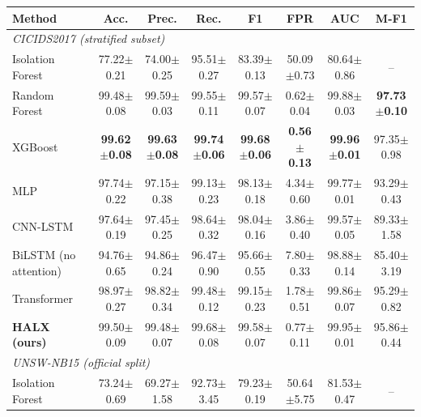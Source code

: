\begin{tabular}{@{}l@{\hspace{3pt}}ccccccc@{}}
\toprule
\textbf{Method} & \textbf{Acc.} & \textbf{Prec.} & \textbf{Rec.} & \textbf{F1} & \textbf{FPR} & \textbf{AUC} & \textbf{M-F1} \\
\midrule
\multicolumn{8}{l}{\textit{CICIDS2017 (stratified subset)}} \\
Isolation Forest~\cite{liu2008iforest} & 77.22{\tiny$\pm$0.21} & 74.00{\tiny$\pm$0.25} & 95.51{\tiny$\pm$0.27} & 83.39{\tiny$\pm$0.13} & 50.09{\tiny$\pm$0.73} & 80.64{\tiny$\pm$0.86} & -- \\
Random Forest~\cite{breiman2001rf} & 99.48{\tiny$\pm$0.08} & 99.59{\tiny$\pm$0.03} & 99.55{\tiny$\pm$0.11} & 99.57{\tiny$\pm$0.07} & 0.62{\tiny$\pm$0.04} & 99.88{\tiny$\pm$0.03} & \textbf{97.73{\tiny$\pm$0.10}} \\
XGBoost~\cite{chen2016xgboost} & \textbf{99.62{\tiny$\pm$0.08}} & \textbf{99.63{\tiny$\pm$0.08}} & \textbf{99.74{\tiny$\pm$0.06}} & \textbf{99.68{\tiny$\pm$0.06}} & \textbf{0.56{\tiny$\pm$0.13}} & \textbf{99.96{\tiny$\pm$0.01}} & 97.35{\tiny$\pm$0.98} \\
MLP & 97.74{\tiny$\pm$0.22} & 97.15{\tiny$\pm$0.38} & 99.13{\tiny$\pm$0.23} & 98.13{\tiny$\pm$0.18} & 4.34{\tiny$\pm$0.60} & 99.77{\tiny$\pm$0.01} & 93.29{\tiny$\pm$0.43} \\
CNN-LSTM~\cite{halbouni2022cnnlstm} & 97.64{\tiny$\pm$0.19} & 97.45{\tiny$\pm$0.25} & 98.64{\tiny$\pm$0.32} & 98.04{\tiny$\pm$0.16} & 3.86{\tiny$\pm$0.40} & 99.57{\tiny$\pm$0.05} & 89.33{\tiny$\pm$1.58} \\
BiLSTM (no attention) & 94.76{\tiny$\pm$0.65} & 94.86{\tiny$\pm$0.24} & 96.47{\tiny$\pm$0.90} & 95.66{\tiny$\pm$0.55} & 7.80{\tiny$\pm$0.33} & 98.88{\tiny$\pm$0.14} & 85.40{\tiny$\pm$3.19} \\
Transformer~\cite{gorishniy2021revisiting} & 98.97{\tiny$\pm$0.27} & 98.82{\tiny$\pm$0.34} & 99.48{\tiny$\pm$0.12} & 99.15{\tiny$\pm$0.23} & 1.78{\tiny$\pm$0.51} & 99.86{\tiny$\pm$0.07} & 95.29{\tiny$\pm$0.82} \\
\textbf{HALX (ours)} & 99.50{\tiny$\pm$0.09} & 99.48{\tiny$\pm$0.07} & 99.68{\tiny$\pm$0.08} & 99.58{\tiny$\pm$0.07} & 0.77{\tiny$\pm$0.11} & 99.95{\tiny$\pm$0.01} & 95.86{\tiny$\pm$0.44} \\
\midrule
\multicolumn{8}{l}{\textit{UNSW-NB15 (official split)}} \\
Isolation Forest~\cite{liu2008iforest} & 73.24{\tiny$\pm$0.69} & 69.27{\tiny$\pm$1.58} & 92.73{\tiny$\pm$3.45} & 79.23{\tiny$\pm$0.19} & 50.64{\tiny$\pm$5.75} & 81.53{\tiny$\pm$0.47} & -- \\

\end{tabular}
